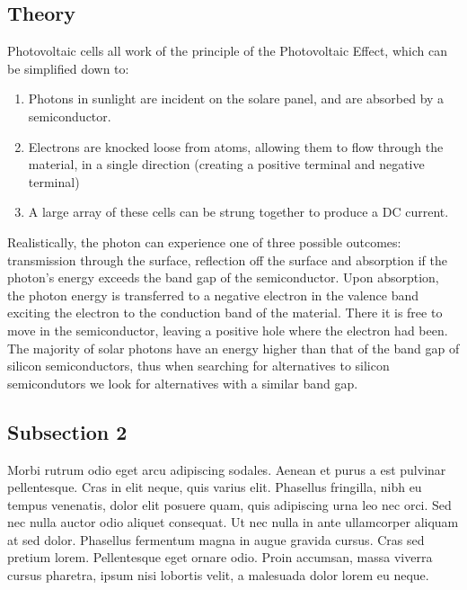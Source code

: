 \subsection{Theory}

Photovoltaic cells all work of the principle of the Photovoltaic Effect, which can be simplified down to:

	\begin{enumerate}
	\item Photons in sunlight are incident on the solare panel, and are absorbed by a semiconductor.
	\item Electrons are knocked loose from atoms, allowing them to flow through the material, in a single direction (creating a positive terminal and negative terminal)
	\item A large array of these cells can be strung together to produce a DC current.
	\end{enumerate}

	Realistically, the photon can experience one of three possible outcomes: transmission through the surface, reflection off the surface and absorption if the photon's energy exceeds the band gap of the semiconductor. Upon absorption, the photon energy is transferred to a negative electron in the valence band exciting the electron to the conduction band of the material. There it is free to move in the semiconductor, leaving a positive hole where the electron had been. The majority of solar photons have an energy higher than that of the band gap of silicon semiconductors, thus when searching for alternatives to silicon semicondutors we look for alternatives with a similar band gap.


\subsection{Subsection 2}
Morbi rutrum odio eget arcu adipiscing sodales. Aenean et purus a est pulvinar pellentesque. Cras in elit neque, quis varius elit. Phasellus fringilla, nibh eu tempus venenatis, dolor elit posuere quam, quis adipiscing urna leo nec orci. Sed nec nulla auctor odio aliquet consequat. Ut nec nulla in ante ullamcorper aliquam at sed dolor. Phasellus fermentum magna in augue gravida cursus. Cras sed pretium lorem. Pellentesque eget ornare odio. Proin accumsan, massa viverra cursus pharetra, ipsum nisi lobortis velit, a malesuada dolor lorem eu neque.

